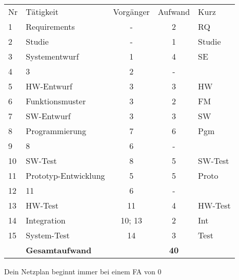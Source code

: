 \documentclass{beamer}
\begin{document}
\begin{frame}[t,shrink=65]
{    \begin{tabular}{l|lccl}
      \hline
      Nr & Tätigkeit        & Vorgänger & Aufwand & Kurz \\
      1  & Requirements     & -     & 2 & RQ \\
      2  & Studie           & -     & 1 & Studie \\
      3  & Systementwurf    & 1     & 4 & SE \\
      4  &   3              & 2     & - & \\
      5  & HW-Entwurf       & 3     & 3 & HW \\
      6  & Funktionsmuster  & 3     & 2 & FM \\
      7  & SW-Entwurf       & 3     & 3 & SW \\
      8  & Programmierung   & 7     & 6 & Pgm \\
      9  & 8                & 6     & - & \\
      10 & SW-Test          & 8     & 5 & SW-Test \\
      11 & Prototyp-Entwicklung & 5 & 5 & Proto \\
      12 & 11               & 6     & - & \\
      13 & HW-Test          & 11    & 4 & HW-Test \\
      14 & Integration      & 10; 13 & 2 & Int \\
      15 & System-Test      & 14    & 3 & Test \\
      \hline
        & \textbf{Gesamtaufwand} &   & \textbf{40} \\
    \end{tabular}
}

\par\vspace{1cm}\noindent %
\begin{itemize}

{\huge
    \item<only@+> {Dein Netzplan beginnt immer bei einem FA von 0}

}
\end{itemize}
\end{frame}
\end{document}
